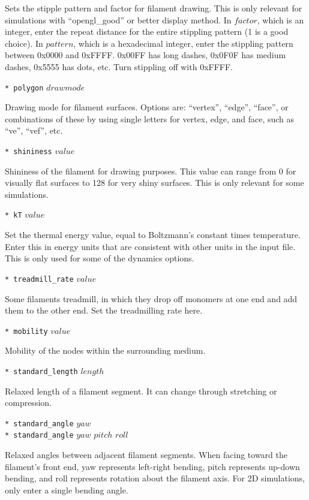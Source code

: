 \documentclass {scrbook}
\newcommand {\ttt} {\texttt}
\begin{document}
\begin{description}
Sets the stipple pattern and factor for filament drawing. This is only relevant for simulations with ``opengl\_good'' or better display method. In $factor$, which is an integer, enter the repeat distance for the entire stippling pattern (1 is a good choice). In $pattern$, which is a hexadecimal integer, enter the stippling pattern between 0x0000 and 0xFFFF. 0x00FF has long dashes, 0x0F0F has medium dashes, 0x5555 has dots, etc. Turn stippling off with 0xFFFF.

\item{\ttt{* polygon} $drawmode$}

Drawing mode for filament surfaces. Options are: ``vertex'', ``edge'', ``face'', or combinations of these by using single letters for vertex, edge, and face, such as ``ve'', ``vef'', etc.

\item{\ttt{* shininess} $value$}

Shininess of the filament for drawing purposes. This value can range from 0 for visually flat surfaces to 128 for very shiny surfaces. This is only relevant for some simulations.

\item{\ttt{* kT} $value$}

Set the thermal energy value, equal to Boltzmann's constant times temperature. Enter this in energy units that are consistent with other units in the input file. This is only used for some of the dynamics options.

\item{\ttt{* treadmill\_rate} $value$}

Some filaments treadmill, in which they drop off monomers at one end and add them to the other end. Set the treadmilling rate here.

\item{\ttt{* mobility} $value$}

Mobility of the nodes within the surrounding medium.

\item{\ttt{* standard\_length} $length$}

Relaxed length of a filament segment. It can change through stretching or compression.

\item{\ttt{* standard\_angle} $yaw$\\
\ttt{* standard\_angle} $yaw$ $pitch$ $roll$}

Relaxed angles between adjacent filament segments. When facing toward the filament's front end, yaw represents left-right bending, pitch represents up-down bending, and roll represents rotation about the filament axis. For 2D simulations, only enter a single bending angle.


\end{description}
\end{document}
